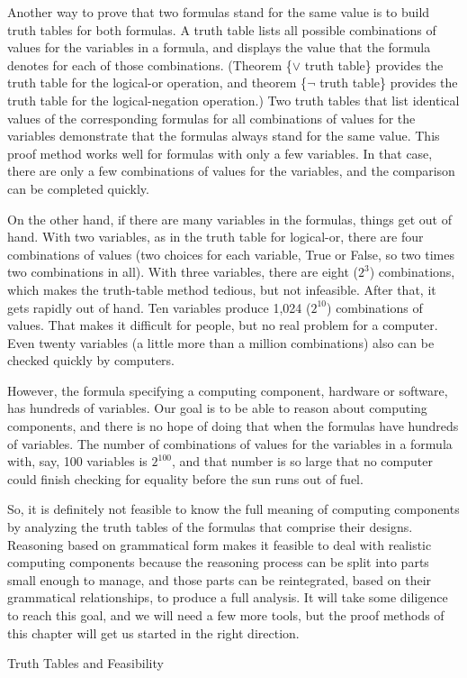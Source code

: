 \begin{aside}
Another way to prove that two formulas stand
for the same value is to build truth tables for both formulas.
A truth table lists all possible combinations of values for the
variables in a formula, and displays the value that the formula
denotes for each of those combinations. (Theorem \{$\vee$ truth table\} provides
the truth table for the logical-or operation, and theorem \{$\neg$ truth table\}
provides the truth table for the logical-negation operation.)
Two truth tables that list identical values of the corresponding
formulas for all combinations of values for
the variables demonstrate that the formulas always stand for the
same value. This proof method works well for formulas with only
a few variables. In that case, there are only a few combinations
of values for the variables, and the comparison can be completed quickly.

On the other hand, if there are many variables in the formulas,
things get out of hand. With two variables, as in the truth table
for logical-or, there are four combinations of values
(two choices for each variable, True or False, so two times two
combinations in all). With three variables, there are eight
($2^3$) combinations, which makes the truth-table method tedious,
but not infeasible. After that, it gets rapidly out of hand.
Ten variables produce 1,024 ($2^{10}$) combinations of values.
That makes it difficult for people, but no real problem for a computer.
Even twenty variables (a little more than a million combinations)
also can be checked quickly by computers.

However, the formula specifying a computing component,
hardware or software, has hundreds of variables.
Our goal is to be able to reason about
computing components, and there is no hope of doing
that when the formulas have hundreds of variables. The number of combinations
of values for the variables in a formula with, say,
100 variables is $2^{100}$, and that number is so large that no computer could
finish checking for equality before the sun runs out of fuel.

So, it is definitely not feasible to know the full meaning
of computing components by analyzing the truth tables of the
formulas that comprise their designs. Reasoning based on grammatical form
makes it feasible to deal with realistic computing components
because the reasoning process can be split into parts small enough
to manage, and those parts can be reintegrated, based on
their grammatical relationships, to produce a full analysis.
It will take some diligence to reach this goal, and
we will need a few more tools, but the proof methods
of this chapter will get us started in the right direction.
\caption{Truth Tables and Feasibility}
\label{feasibility}
\end{aside}

